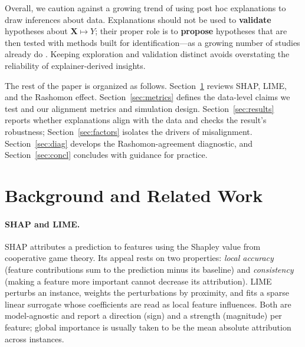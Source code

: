 \documentclass[12pt,letterpaper]{article}
\newcommand{\Xto}{\mathbf{X}\mapsto Y}
\begin{document}
Overall, we caution against a growing trend of using post hoc explanations to draw
inferences about data. Explanations should not be used to \textbf{validate}
hypotheses about $\Xto$; their proper role is to \textbf{propose} hypotheses that
are then tested with methods built for identification---as a growing number of
studies already do \citep{zhang2023can,feng2025ai,senoner2022using}. Keeping exploration and
validation distinct avoids overstating the reliability of
explainer-derived insights.

The rest of the paper is organized as follows.
Section~\ref{sec:related} reviews SHAP, LIME, and the Rashomon effect.
Section~\ref{sec:metrics} defines the data-level claims we test and our alignment
metrics and simulation design.
Section~\ref{sec:results} reports whether explanations align with the data and
checks the result's robustness;
Section~\ref{sec:factors} isolates the drivers of misalignment.
Section~\ref{sec:diag} develops the Rashomon-agreement diagnostic, and
Section~\ref{sec:concl} concludes with guidance for practice.

\section{Background and Related Work}
\label{sec:related}

\vspace{-3mm}
\paragraph{SHAP and LIME.}
SHAP \citep{lundberg17shap} attributes a prediction to features using the Shapley
value from cooperative game theory. Its appeal rests on two properties:
\emph{local accuracy} (feature contributions sum to the prediction minus its
baseline) and \emph{consistency} (making a feature more important cannot decrease
its attribution). LIME \citep{ribeiro16lime} perturbs an instance, weights the
perturbations by proximity, and fits a sparse linear surrogate whose coefficients
are read as local feature influences. Both are model-agnostic and report a
direction (sign) and a strength (magnitude) per feature; global importance is
usually taken to be the mean absolute attribution across instances.

\vspace{-3mm}
\end{document}
